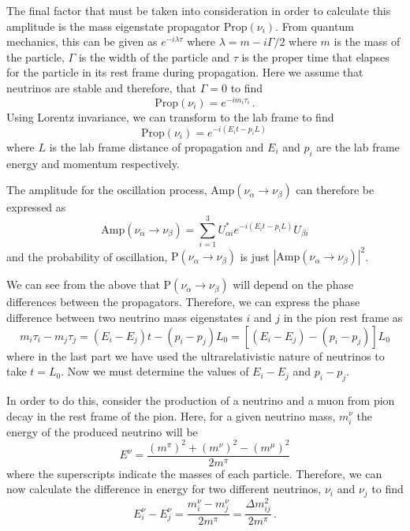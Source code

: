 The final factor that must be taken into consideration in order to calculate this amplitude is the mass eigenstate propagator $\text{Prop}(\nu_{i})$.
From quantum mechanics, this can be given as $e^{-i \lambda \tau}$ where $\lambda = m - i \Gamma /2$ where $m$ is the mass of the particle, $\Gamma$ is the width of the particle and $\tau$ is the proper time that elapses for the particle in its rest frame during propagation. 
Here we assume that neutrinos are stable and therefore, that $\Gamma = 0$ to find
\begin{equation}
  \text{Prop}(\nu_{i}) = e^{-i m_{i} \tau_{i}} \, .
\end{equation}
Using Lorentz invariance, we can transform to the lab frame to find
\begin{equation}
  \text{Prop}(\nu_{i}) = e^{-i (E_{i}t - p_{i}L) } \, 
\end{equation}
where $L$ is the lab frame distance of propagation and $E_{i}$ and $p_{i}$ are the lab frame energy and momentum respectively.

The amplitude for the oscillation process, $\text{Amp}(\nu_{\alpha} \rightarrow \nu_{\beta})$ can therefore be expressed as
\begin{equation}
  \text{Amp}(\nu_{\alpha} \rightarrow \nu_{\beta}) = \sum_{i=1}^{3} U^{*}_{\alpha i} e^{-i (E_{i}t - p_{i}L) } U_{\beta i}
  \label{eq:oscAmp}
\end{equation}
and the probability of oscillation, $\text{P}(\nu_{\alpha} \rightarrow \nu_{\beta})$ is just $|\text{Amp}(\nu_{\alpha} \rightarrow \nu_{\beta})|^{2}$.

We can see from the above that $\text{P}(\nu_{\alpha} \rightarrow \nu_{\beta})$ will depend on the phase differences between the propagators.
Therefore, we can express the phase difference between two neutrino mass eigenstates $i$ and $j$ in the pion rest frame as
\begin{equation}
  m_{i}\tau_{i} - m_{j}\tau_{j} = \left( E_{i} - E_{j} \right)t - \left( p_{i} - p_{j} \right) L_{0}  =  \left[ \left( E_{i} - E_{j} \right) - \left( p_{i} - p_{j} \right) \right]L_{0}
  \label{eq:phaseDiff}
\end{equation}
where in the last part we have used the ultrarelativistic nature of neutrinos to take $t=L_{0}$.
Now we must determine the values of $E_{i} - E_{j}$ and $p_{i} - p_{j}$.

In order to do this, consider the production of a neutrino and a muon from pion decay in the rest frame of the pion.
Here, for a given neutrino mass, $m_{i}^{\nu}$ the energy of the produced neutrino will be
\begin{equation}
  E^{\nu} = \frac{ (m^{\pi})^{2} + (m^{\nu})^{2} - (m^{\mu})^{2} }{ 2m^{\pi} }
\end{equation}
where the superscripts indicate the masses of each particle.
Therefore, we can now calculate the difference in energy for two different neutrinos, $\nu_{i}$ and $\nu_{j}$ to find
\begin{equation}
  E^{\nu}_{i} - E^{\nu}_{j} = \frac{ m_{i}^{\nu} - m_{j}^{\nu} }{ 2m^{\pi} } = \frac{\Delta m_{ij}^{2}}{2m^{\pi}} \, .
  \label{eq:nuDeltaE}
\end{equation}


